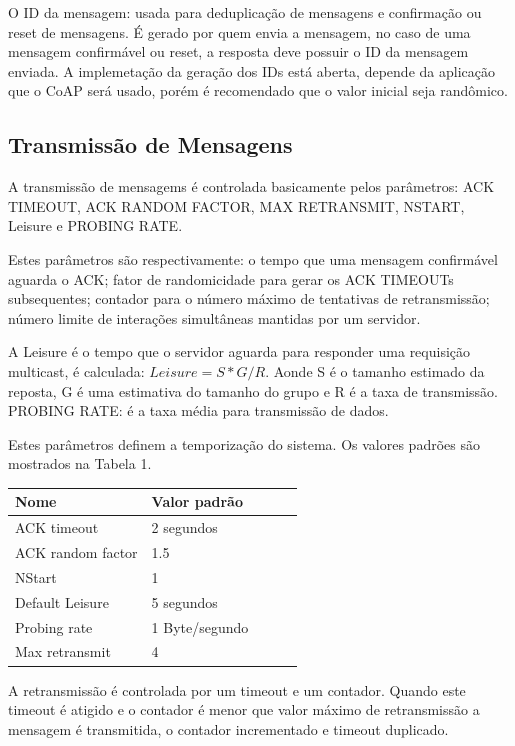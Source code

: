 O ID da mensagem: usada para deduplica\c{c}\~ao de mensagens e confirma\c{c}\~ao ou reset de mensagens. \'E gerado por quem envia a mensagem, no caso de uma mensagem confirm\'avel ou reset, a resposta deve possuir o ID da mensagem enviada. A implemeta\c{c}\~ao da gera\c{c}\~ao dos IDs est\'a aberta, depende da aplica\c{c}\~ao que o CoAP ser\'a usado, por\'em \'e recomendado que o valor inicial seja rand\^omico.
   
\subsection{Transmiss\~ao de Mensagens}
A transmiss\~ao de mensagems \'e controlada basicamente pelos par\^ametros: ACK TIMEOUT, ACK RANDOM FACTOR, MAX RETRANSMIT, NSTART, Leisure e PROBING RATE.

Estes par\^ametros s\~ao respectivamente: o tempo que uma mensagem confirm\'avel aguarda o ACK; fator de randomicidade para gerar os ACK TIMEOUTs subsequentes; contador para o n\'umero m\'aximo de tentativas de retransmiss\~ao; n\'umero limite de intera\c{c}\~oes simult\^aneas mantidas por um servidor.

A Leisure \'e o tempo que o servidor aguarda para responder uma requisi\c{c}\~ao multicast, \'e calculada: \begin{math}Leisure = S * G / R\end{math}. Aonde S \'e o tamanho estimado da reposta, G \'e uma estimativa do tamanho do grupo e R \'e a taxa de transmiss\~ao. PROBING RATE: \'e a taxa m\'edia para transmiss\~ao de dados.

Estes par\^ametros definem a temporiza\c{c}\~ao do sistema. Os valores padr\~oes s\~ao mostrados na Tabela 1.
\begin{table}[h]
\centering
\begin{tabular}{@{}lllll@{}}
\toprule
Nome & Valor padr\~ao & \\ \midrule
ACK timeout & 2 segundos & \\
ACK random factor & 1.5 & \\
NStart & 1 & \\
Default Leisure & 5 segundos & \\
Probing rate & 1 Byte/segundo & \\
Max retransmit & 4 &  \\ \midrule
\end{tabular}
\end{table}

A retransmiss\~ao \'e controlada por um timeout e um contador. Quando este timeout \'e atigido e o contador \'e menor que valor m\'aximo de retransmiss\~ao a mensagem \'e transmitida, o contador incrementado e timeout duplicado.

